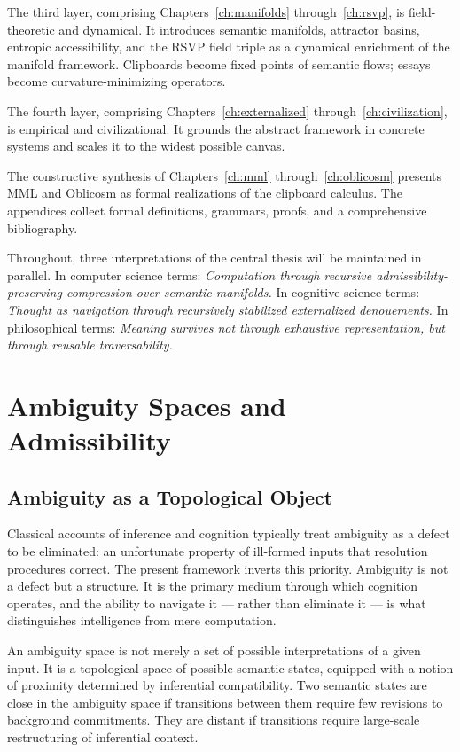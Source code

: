 \documentclass[12pt,oneside]{book}
\theoremstyle{plain}
\theoremstyle{definition}
\theoremstyle{plain}
\begin{document}
The third layer, comprising Chapters~\ref{ch:manifolds} through~\ref{ch:rsvp}, is field-theoretic and dynamical. It introduces semantic manifolds, attractor basins, entropic accessibility, and the RSVP field triple as a dynamical enrichment of the manifold framework. Clipboards become fixed points of semantic flows; essays become curvature-minimizing operators.

The fourth layer, comprising Chapters~\ref{ch:externalized} through~\ref{ch:civilization}, is empirical and civilizational. It grounds the abstract framework in concrete systems and scales it to the widest possible canvas.

The constructive synthesis of Chapters~\ref{ch:mml} through~\ref{ch:oblicosm} presents MML and Oblicosm as formal realizations of the clipboard calculus. The appendices collect formal definitions, grammars, proofs, and a comprehensive bibliography.

Throughout, three interpretations of the central thesis will be maintained in parallel. In computer science terms: \textit{Computation through recursive admissibility-preserving compression over semantic manifolds.} In cognitive science terms: \textit{Thought as navigation through recursively stabilized externalized denouements.} In philosophical terms: \textit{Meaning survives not through exhaustive representation, but through reusable traversability.}

\chapter{Ambiguity Spaces and Admissibility}
\label{ch:ambiguity}

\section{Ambiguity as a Topological Object}

Classical accounts of inference and cognition typically treat ambiguity as a defect to be eliminated: an unfortunate property of ill-formed inputs that resolution procedures correct. The present framework inverts this priority. Ambiguity is not a defect but a structure. It is the primary medium through which cognition operates, and the ability to navigate it — rather than eliminate it — is what distinguishes intelligence from mere computation.

An ambiguity space is not merely a set of possible interpretations of a given input. It is a topological space of possible semantic states, equipped with a notion of proximity determined by inferential compatibility. Two semantic states are close in the ambiguity space if transitions between them require few revisions to background commitments. They are distant if transitions require large-scale restructuring of inferential context.
\end{document}
